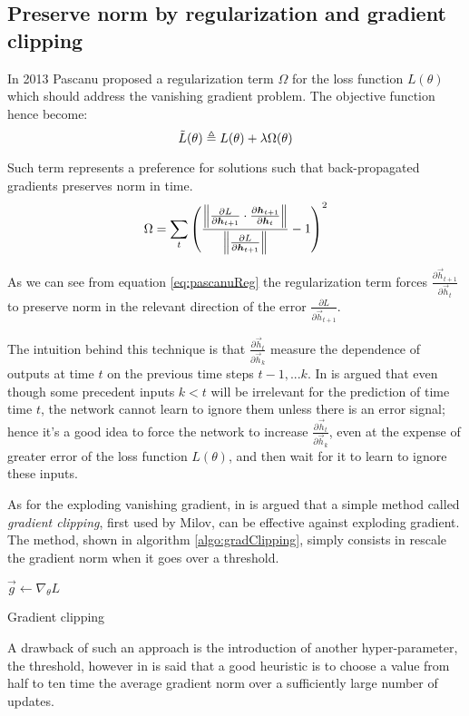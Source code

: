\subsection{Preserve norm by regularization and gradient clipping} 

In 2013 Pascanu \cite{pascanu} proposed a regularization term $\Omega$ for the loss function $L(\theta)$ which should address the vanishing gradient problem.
The objective function hence become:
\begin{equation}
 \tilde{L}(\theta) \triangleq L(\theta) + \lambda\Omega(\theta)
\end{equation}

Such term represents a preference for solutions such that back-propagated gradients preserves norm in time.
\begin{equation}
\Omega = \sum_t \left( \frac{\left\Vert  \frac{\partial L}{\partial \boldsymbol{h}_{t+1}} \cdot \frac{\partial \boldsymbol{h}_{t+1}}{\partial \boldsymbol{h}_t}  \right\Vert}{\left\Vert \frac{\partial L}{\partial \boldsymbol{h}_{t+1}} \right\Vert} -1  \right)^2 
\label{eq:pascanuReg}
\end{equation}

As we can see from equation \ref{eq:pascanuReg} the regularization term forces $\frac{\partial \vec{h}_{t+1}}{\partial \vec{h}_t}$ to preserve norm in the relevant direction of the error $\frac{\partial L}{\partial \vec{h}_{t+1}}$.

The intuition behind this technique is that $\frac{\partial \vec{h}_{t}}{\partial \vec{h}_k}$ measure the dependence of outputs at time $t$ on the previous time steps $t-1,...k$. In \cite{pascanu} is argued that even though some precedent inputs $k<t$ will be irrelevant for the prediction of time time $t$, the network cannot learn to ignore them unless there is an error signal; hence it's a good idea to force the network to increase $\frac{\partial \vec{h}_{t}}{\partial \vec{h}_k}$, even at the expense of greater error of the loss function $L(\theta)$, and then wait for it to learn to ignore these inputs.

As for the exploding vanishing gradient, in \cite{pascanu} is argued that a simple method called \textit{gradient clipping}, first used by Milov\cite{clippingMikolov}, can be effective against exploding gradient. The method, shown in algorithm \ref{algo:gradClipping}, simply consists in rescale the gradient norm when it goes over a threshold.

\begin{algorithm}[]
$\vec{g} \gets \nabla_{\theta} L$\\
\caption{Gradient clipping}
\label{algo:gradClipping}
\end{algorithm}

A drawback of such an approach is the introduction of another hyper-parameter, the threshold, however in \cite{pascanu} is said that a good heuristic
is to choose a value from half to ten time the average gradient norm over a sufficiently large number of updates.